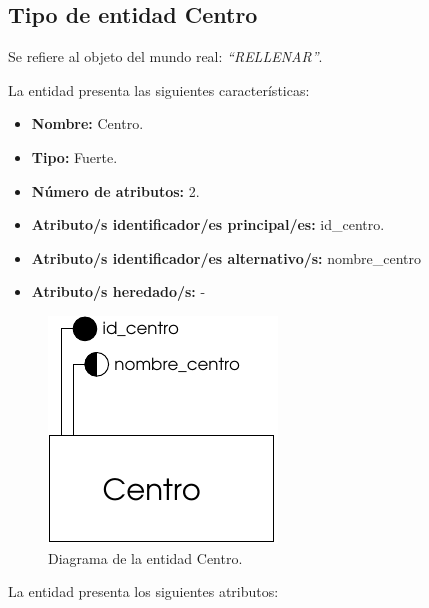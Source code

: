 \subsection{Tipo de entidad Centro}

   \begin{description}

   \item[Definición] Se refiere al objeto del mundo real: \emph{``RELLENAR''}.

   \item[Características] La entidad presenta las siguientes características:
      \begin{itemize}
         \item \textbf{Nombre:} Centro.
         \item \textbf{Tipo:} Fuerte.
         \item \textbf{Número de atributos:} 2.
         \item \textbf{Atributo/s identificador/es principal/es:} id\_centro.
         \item \textbf{Atributo/s identificador/es alternativo/s:} nombre\_centro
         \item \textbf{Atributo/s heredado/s:} -
      \end{itemize}

   \item[Diagrama]
   \item \begin{figure}[h!]
            \begin{center}
            \includegraphics[]{07.Modelo_Entidad-Interrelacion/7.2.Analisis_Entidades/diagramas/centro.pdf}
            \caption{Diagrama de la entidad Centro.}
            \end{center}
         \end{figure}

   \item[Descripción de los atributos] La entidad presenta los siguientes
   atributos:


\end{description}

